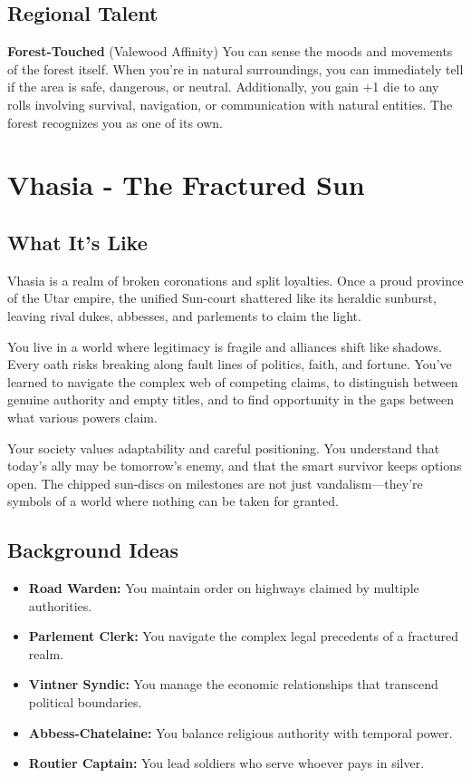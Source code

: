 \documentclass[11pt]{article}
\newcommand{\region}[1]{\section*{#1}}
\newcommand{\subregion}[1]{\subsection*{#1}}
\begin{document}
\begin{multicols}{2}
\subregion{Regional Talent}

\textbf{Forest-Touched} (Valewood Affinity)
You can sense the moods and movements of the forest itself. When you're in natural surroundings, you can immediately tell if the area is safe, dangerous, or neutral. Additionally, you gain +1 die to any rolls involving survival, navigation, or communication with natural entities. The forest recognizes you as one of its own.

\end{multicols}

\region{Vhasia - The Fractured Sun}

\begin{multicols}{2}
\subregion{What It's Like}

Vhasia is a realm of broken coronations and split loyalties. Once a proud province of the Utar empire, the unified Sun-court shattered like its heraldic sunburst, leaving rival dukes, abbesses, and parlements to claim the light.

You live in a world where legitimacy is fragile and alliances shift like shadows. Every oath risks breaking along fault lines of politics, faith, and fortune. You've learned to navigate the complex web of competing claims, to distinguish between genuine authority and empty titles, and to find opportunity in the gaps between what various powers claim.

Your society values adaptability and careful positioning. You understand that today's ally may be tomorrow's enemy, and that the smart survivor keeps options open. The chipped sun-discs on milestones are not just vandalism—they're symbols of a world where nothing can be taken for granted.

\columnbreak

\subregion{Background Ideas}

\begin{itemize}[leftmargin=*]
    \item \textbf{Road Warden:} You maintain order on highways claimed by multiple authorities.
    \item \textbf{Parlement Clerk:} You navigate the complex legal precedents of a fractured realm.
    \item \textbf{Vintner Syndic:} You manage the economic relationships that transcend political boundaries.
    \item \textbf{Abbess-Chatelaine:} You balance religious authority with temporal power.
    \item \textbf{Routier Captain:} You lead soldiers who serve whoever pays in silver.
\end{itemize}


\end{multicols}
\end{document}
